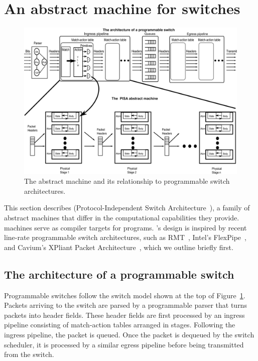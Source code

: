 \section{An abstract machine for switches}
\label{s:absmachine}

\begin{figure}[!t]
  \includegraphics[width=\textwidth]{pisa.pdf}
  \caption{The \absmachine abstract machine and its relationship to
  programmable switch architectures.}
  \label{fig:switch}
\end{figure}

This section describes \absmachine (Protocol-Independent Switch
Architecture~\cite{nick_p4}), a family of abstract machines that differ in the
computational capabilities they provide. \absmachine machines serve as compiler
targets for \pktlanguage programs. \absmachine's design is inspired by recent
line-rate programmable switch architectures, such as RMT~\cite{rmt}, Intel's
FlexPipe~\cite{flexpipe}, and Cavium's XPliant Packet
Architecture~\cite{xpliant}, which we outline briefly first.

\subsection{The architecture of a programmable switch}
Programmable switches follow the switch model shown at the top of
Figure~\ref{fig:switch}.  Packets arriving to the switch are parsed by a
programmable parser that turns packets into header fields. These header fields
are first processed by an ingress pipeline consisting of match-action tables
arranged in stages.  Following the ingress pipeline, the packet is queued. Once
the packet is dequeued by the switch scheduler, it is processed by a similar
egress pipeline before being transmitted from the switch.

